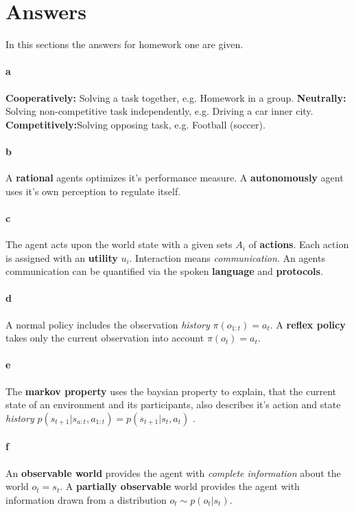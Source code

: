 \section{Answers}
In this sections the answers for homework one are given.
\paragraph{a}
\label{Types_Of_Interaction}
		\textbf{Cooperatively:} Solving a task together, e.g. Homework in a group.
		\textbf{Neutrally:} Solving non-competitive task independently, e.g. Driving a car inner city.
		\textbf{Competitively:}Solving opposing task, e.g. Football (soccer).
\paragraph{b}
\label{Rational_Autonomous_Agent}
	 A \textbf{rational} agents optimizes it's performance measure. A \textbf{autonomously} agent uses it's own perception to regulate itself.
\paragraph{c}
\label{Interaction}
	The agent acts upon the world state with a given sets $A_i$ of \textbf{actions}. Each action is assigned with an \textbf{utility} $u_i$.
	Interaction means \textit{communication}. An agents communication can be quantified via the spoken \textbf{language} and \textbf{protocols}.
\paragraph{d}
\label{Relfex_policies}
	A normal policy includes the observation \textit{history} $\pi(o_{1:t})= a_t $.
	A \textbf{reflex policy} takes only the current observation into account $\pi(o_t)=a_t$.
\paragraph{e}
\label{Markov Property}	
	The \textbf{markov property} uses the baysian property to explain, that the current state of an environment and its participants, also describes it's action and state \textit{history} $p( s_{t+1}|s_{a:t} , a_{1:t} ) = p(s_{t+1}|s_t,a_t)$ .
\paragraph{f}
\label{Observability}
	An \textbf{observable world} provides the agent with \textit{complete information} about the world $o_t = s_t $.
	A \textbf{partially observable} world provides the agent with information drawn from a distribution $o_t \sim p(o_t|s_t)$.

